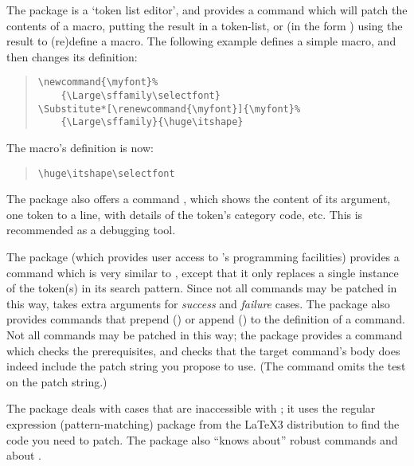 The  package is a `token list editor', and provides a
command  which will patch the
contents of a macro, putting the result in a token-list, or
(in the form ) using the result to (re)define a
macro.  The following example defines a simple macro, and then changes
its definition:
\begin{quote}
\begin{verbatim}
\newcommand{\myfont}%
    {\Large\sffamily\selectfont}
\Substitute*[\renewcommand{\myfont}]{\myfont}%
    {\Large\sffamily}{\huge\itshape}
\end{verbatim}
\end{quote}
The macro's definition is now:
\begin{quote}
\begin{verbatim}
\huge\itshape\selectfont
\end{verbatim}
\end{quote}

The package also offers a command , which shows the
content of its argument, one token to a line, with details of the
token's category code, etc.  This is recommended as a debugging tool.

The  package (which provides user access to \eTeX{}'s
programming facilities) provides a command  which is
very similar to , except that it only replaces a
single instance of the token(s) in its search pattern.  Since not all
commands may be patched in this way,  takes extra
arguments for \emph{success} and \emph{failure} cases.  The
package also provides commands that prepend () or append
() to the definition of a command.  Not all commands may
be patched in this way; the package provides a command
 which checks the prerequisites, and checks that the
target command's body does indeed include the patch string you propose
to use.  (The command  omits the test on the patch
string.)

The  package deals with cases that are
inaccessible with ; it uses the regular expression
(pattern-matching) package  from the \LaTeX{}3
distribution to find the code you need to patch.  The package also
``knows about'' robust commands and about
.

